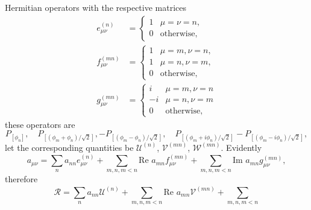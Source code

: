\documentclass[a4paper]{article}
\theoremstyle{definition}
\theoremstyle{plain}
\begin{document}
\begin{enumerate}
            Hermitian operators with the respective matrices
            \begin{align}
                e_{\mu\nu}^{(n)}
                &= \begin{cases}
                    1 & \mu = \nu = n, \\
                    0 & \text{otherwise},
                \end{cases} \\
                f_{\mu\nu}^{(mn)}
                &= \begin{cases}
                    1 & \mu = m, \nu = n, \\
                    1 & \mu = n, \nu = m, \\
                    0 & \text{otherwise},
                \end{cases} \\
                g_{\mu\nu}^{(mn)}
                &= \begin{cases}
                    i & \mu = m, \nu = n \\
                    -i & \mu = n, \nu = m \\
                    0 & \text{otherwise},
                \end{cases}
            \end{align}
            these operators are
            \begin{equation}
                P_{[\phi_n]},
                \quad
                P_{[(\phi_m+\phi_n) / \sqrt{2}]},
                - P_{[(\phi_m-\phi_n) / \sqrt{2}]},
                \quad
                P_{[(\phi_m + i\phi_n) / \sqrt{2}]} -
                P_{[(\phi_m - i\phi_n) / \sqrt{2}]},
            \end{equation}
            let the corresponding quantities be
            $\mathcal{U}^{(n)}$, $\mathcal{V}^{(mn)}$,
            $\mathcal{W}^{(mn)}$. Evidently
            \begin{equation}
                a_{\mu\nu}
                = \sum_{n}^{} a_{nn} e_{\mu\nu}^{(n)}
                + \sum_{m,n, m < n}^{} \text{Re }
                a_{mn}f_{\mu\nu}^{(mn)} + \sum_{m,n,m<n}^{}
                \text{Im } a_{mn} g_{\mu\nu}^{(mn)},
            \end{equation}
            therefore
            \begin{equation}
                \mathcal{R}
                = \sum_{n}^{} a_{nn} \mathcal{U}^{(n)} +
                \sum_{m,n,m<n}^{} \text{Re } a_{mn}
                \mathcal{V}^{(mn)} + \sum_{m,n,m<n}^{}

\end{equation}
\end{enumerate}
\end{document}
